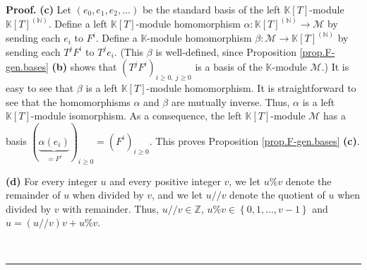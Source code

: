 \documentclass[numbers=enddot,12pt,final,onecolumn,notitlepage]{scrartcl}%
\theoremstyle{definition}
\newenvironment{proof}[1][Proof]{\noindent\textbf{#1.} }{\ \rule{0.5em}{0.5em}}
\begin{document}
\begin{proof}
\textbf{(c)} Let $\left(  e_{0},e_{1},e_{2},\ldots\right)  $ be the standard
basis of the left $\mathbb{K}\left[  T\right]  $-module $\mathbb{K}\left[
T\right]  ^{\left(  \mathbb{N}\right)  }$. Define a left $\mathbb{K}\left[
T\right]  $-module homomorphism $\alpha:\mathbb{K}\left[  T\right]  ^{\left(
\mathbb{N}\right)  }\rightarrow\mathcal{M}$ by sending each $e_{i}$ to $F^{i}%
$. Define a $\mathbb{K}$-module homomorphism $\beta:\mathcal{M}\rightarrow
\mathbb{K}\left[  T\right]  ^{\left(  \mathbb{N}\right)  }$ by sending each
$T^{j}F^{i}$ to $T^{j}e_{i}$. (This $\beta$ is well-defined, since Proposition
\ref{prop.F-gen.bases} \textbf{(b)} shows that $\left(  T^{j}F^{i}\right)
_{i\geq0,\ j\geq0}$ is a basis of the $\mathbb{K}$-module $\mathcal{M}$.) It
is easy to see that $\beta$ is a left $\mathbb{K}\left[  T\right]  $-module
homomorphism. It is straightforward to see that the homomorphisms $\alpha$ and
$\beta$ are mutually inverse. Thus, $\alpha$ is a left $\mathbb{K}\left[
T\right]  $-module isomorphism. As a consequence, the left $\mathbb{K}\left[
T\right]  $-module $\mathcal{M}$ has a basis $\left(  \underbrace{\alpha
\left(  e_{i}\right)  }_{=F^{i}}\right)  _{i\geq0}=\left(  F^{i}\right)
_{i\geq0}$. This proves Proposition \ref{prop.F-gen.bases} \textbf{(c)}.
\medskip

\textbf{(d)} For every integer $u$ and every positive integer $v$, we let
$u\%v$ denote the remainder of $u$ when divided by $v$, and we let $u//v$
denote the quotient of $u$ when divided by $v$ with remainder. Thus,
$u//v\in\mathbb{Z}$, $u\%v\in\left\{  0,1,\ldots,v-1\right\}  $ and $u=\left(
u//v\right)  v+u\%v$.


\end{proof}
\end{document}
